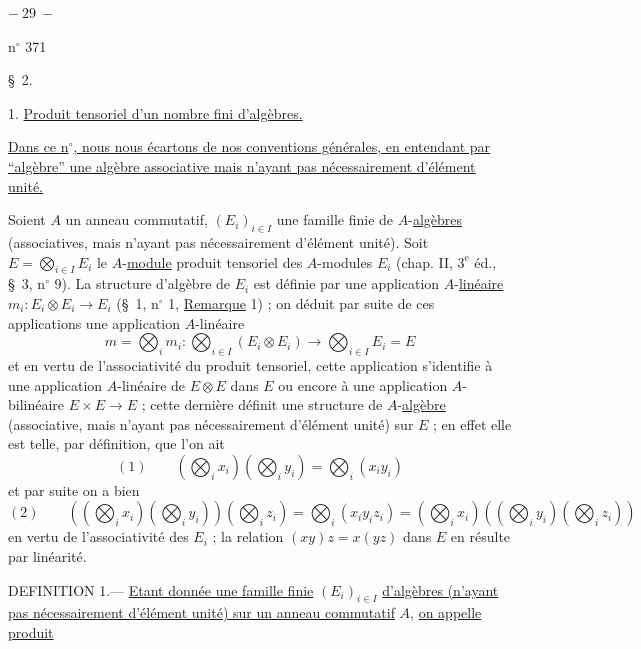\begin{center}$-\ 29\ -$\end{center}
\hfill n$^\circ$ 371

\begin{center}\S\ 2. \end{center}

1. \uline{Produit tensoriel d'un nombre fini d'algèbres.}

\uline{Dans ce n$^\circ$, nous nous écartons de nos conventions générales, en entendant par ``algèbre'' une algèbre associative mais n'ayant pas nécessairement d'élément unité.}

Soient $A$ un anneau commutatif, $(E_i)_{i\in I}$ une famille finie de $A$-\uline{algèbres} (associatives, mais n'ayant pas nécessairement d'élément unité). Soit $E=\bigotimes_{i\in I}E_i$ le $A$-\uline{module} produit tensoriel des $A$-modules $E_i$ (chap. II, $3^{\mathrm e}$ éd., \S\ 3, n$^\circ$ 9). La structure d'algèbre de $E_i$ est définie par une application $A$-\uline{linéaire} $m_i:E_i\otimes E_i\to E_i$ (\S\ 1, n$^\circ$ 1, \uline{Remarque} 1) ; on déduit par suite de ces applications une application $A$-linéaire
\[
m=\bigotimes_i m_i:\bigotimes_{i\in I}(E_i\otimes E_i)\longrightarrow\bigotimes_{i\in I}E_i=E
\]
et en vertu de l'associativité du produit tensoriel, cette application s'identifie à une application $A$-linéaire de $E\otimes E$ dans $E$ ou encore à une application $A$-bilinéaire $E\times E\to E$ ; cette dernière définit une structure de $A$-\uline{algèbre} (associative, mais n'ayant pas nécessairement d'élément unité) sur $E$ ; en effet elle est telle, par définition, que l'on ait
\[
(1)\qquad \left(\bigotimes_i x_i\right)\left(\bigotimes_i y_i\right)=\bigotimes_i(x_i y_i)
\]
et par suite on a bien
\[
(2)\qquad \left(\left(\bigotimes_i x_i\right)\left(\bigotimes_i y_i\right)\right)\left(\bigotimes_i z_i\right)=\bigotimes_i(x_i y_i z_i)=\left(\bigotimes_i x_i\right)\left(\left(\bigotimes_i y_i\right)\left(\bigotimes_i z_i\right)\right)
\]
en vertu de l'associativité des $E_i$ ; la relation $(xy)z=x(yz)$ dans $E$ en résulte par linéarité.

DEFINITION 1.--- \uline{Etant donnée une famille finie} $(E_i)_{i\in I}$ \uline{d'algèbres (n'ayant pas nécessairement d'élément unité) sur un anneau commutatif} $A$, \uline{on appelle produit}
